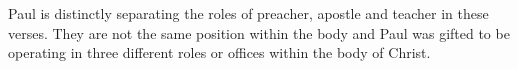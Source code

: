 Paul is distinctly separating the roles of preacher, apostle and teacher in these verses. They are not the same position within the body and Paul was gifted to be operating in three different roles or offices within the body of Christ.

